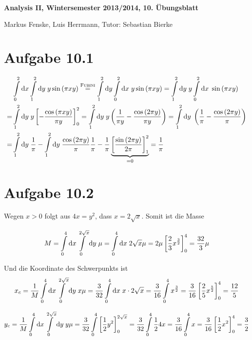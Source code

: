 \documentclass[a4paper,german,12pt,smallheadings]{scrartcl}
\begin{document}
\begin{center}
\bfseries %
\sffamily %
\vspace{-40pt}
Analysis II, Wintersemester 2013/2014, 10. Übungsblatt

Markus Fenske, Luis Herrmann, Tutor: Sebastian Bierke
\vspace{-10pt}
\end{center}
\allowdisplaybreaks %
\section*{Aufgabe 10.1}
\begin{align*}
  & \int\limits_0^2 \dif x \int\limits_1^2 \dif y \; y \sin\del{\pi x y} \overset{\text{\textsc{Fubini}}}{=}
    \int\limits_1^2 \dif y \int\limits_0^2 \dif x \; y \sin\del{\pi x y} =
    \int\limits_1^2 \dif y \; y \int\limits_0^2 \dif x \; \sin\del{\pi x y} \\ =
  & \int\limits_1^2 \dif y \; y \sbr{- \frac{\cos\del{\pi x y}}{\pi y}}_0^2 =
    \int\limits_1^2 \dif y \; y \del{\frac{1}{\pi y} - \frac{\cos\del{2 \pi y}}{\pi y}} =
    \int\limits_1^2 \dif y \; \del{\frac{1}{\pi} - \frac{\cos\del{2 \pi y}}{\pi}} \\ =
  & \int\limits_1^2 \dif y \; \frac{1}{\pi} - \int\limits_1^2 \dif y \; \frac{\cos\del{2 \pi y}}{\pi}
    \frac{1}{\pi} - \frac{1}{\pi} \underbrace{\sbr{\frac{\sin\del{2 \pi y}}{2 \pi}}_1^2}_{=0} = \frac{1}{\pi}
\end{align*}

\section*{Aufgabe 10.2}
Wegen $x > 0$ folgt aus $4x = y^2$, dass $x = 2 \sqrt{x}$. Somit ist die Masse

\begin{align*}
  M
  = \int\limits_0^4 \dif x \int\limits_0^{2 \sqrt{x}} \dif y \; \mu
  = \int\limits_0^4 \dif x \; 2 \sqrt{x} \mu
  = 2 \mu \sbr{\frac{2}{3} x^\frac{3}{2}}_0^4
  = \frac{32}{3} \mu
\end{align*}

Und die Koordinate des Schwerpunkts ist
\begin{align*}
  x_c
  = \frac{1}{M} \int\limits_0^4 \dif x \int\limits_0^{2\sqrt{x}} \dif y \; x \mu
  = \frac{3}{32} \int\limits_0^4 \dif x \; x \cdot 2 \sqrt{x}
  = \frac{3}{16} \int\limits_0^4 x^\frac{3}{2}
  = \frac{3}{16} \sbr{\frac{2}{5} x^\frac{5}{2}}_0^4
  = \frac{12}{5}
\end{align*}

\begin{align*}
  y_c
  = \frac{1}{M} \int\limits_0^4 \dif x \int\limits_0^{2 \sqrt{x}} \dif y \; y \mu
  = \frac{3}{32} \int\limits_0^4 \sbr{\frac{1}{2} y^2}_0^{2\sqrt{x}}
  = \frac{3}{32} \int\limits_0^4 \frac{1}{2} 4 x
  = \frac{3}{16} \int\limits_0^4 x
  = \frac{3}{16} \sbr{\frac{1}{2} x^2}_0^4
  = \frac{3}{2}
\end{align*}
\end{document}
